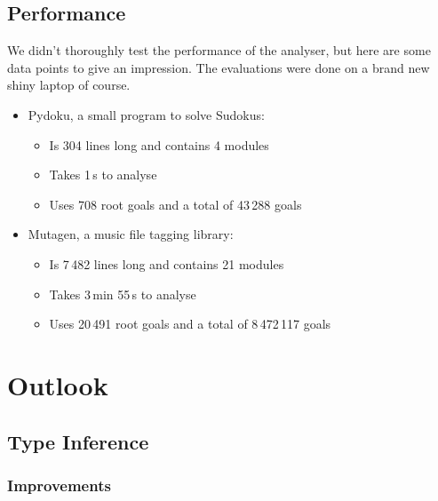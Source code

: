 \documentclass[12pt,halfparskip,DIV11,BCOR10mm]{scrreprt}
\begin{document}
\section{Performance}

We didn't thoroughly test the performance of the analyser, but here are some data points to give an impression. The evaluations were done on a brand new shiny laptop of course.

\begin{itemize}
    \item Pydoku, a small program to solve Sudokus:
    \begin{itemize}
        \item Is 304 lines long and contains 4 modules
        \item Takes 1\,s to analyse
        \item Uses 708 root goals and a total of 43\,288 goals
    \end{itemize}
    \item Mutagen, a music file tagging library:
    \begin{itemize}
        \item Is 7\,482 lines long and contains 21 modules
        \item Takes 3\,min 55\,s to analyse
        \item Uses 20\,491 root goals and a total of 8\,472\,117 goals
    \end{itemize}
\end{itemize}



\chapter{Outlook}


\section{Type Inference}
\label{outlook_type_inference}

\subsection{Improvements}
\end{document}

